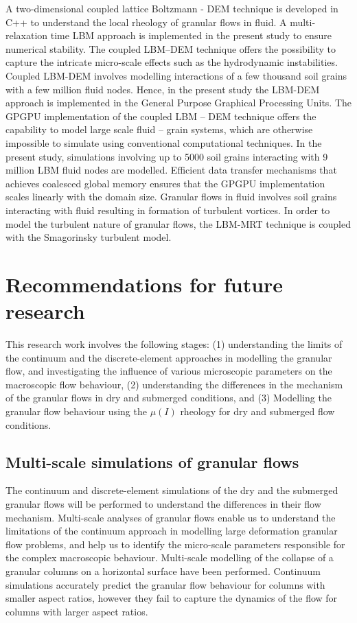 A two-dimensional coupled lattice Boltzmann - DEM technique is developed in C++ 
to understand the local rheology of granular flows in fluid. A multi-relaxation 
time LBM approach is implemented in the present study to ensure numerical 
stability. The coupled LBM--DEM technique offers the possibility to capture the 
intricate micro-scale effects such as the hydrodynamic instabilities. Coupled 
LBM-DEM involves modelling interactions of a few thousand soil grains with a 
few million fluid nodes. Hence, in the present study the LBM-DEM approach is 
implemented in the General Purpose Graphical Processing Units. The GPGPU 
implementation of the coupled LBM -- DEM technique offers the capability to 
model large scale fluid -- grain systems, which are otherwise impossible to 
simulate using conventional computational techniques. In the present study, 
simulations involving up to 5000 soil grains interacting with 9 million LBM 
fluid nodes are modelled. Efficient data transfer mechanisms that achieves 
coalesced global memory ensures that the GPGPU implementation scales linearly 
with the domain size. Granular flows in fluid involves soil grains interacting 
with fluid resulting in formation of turbulent vortices. In order to model the 
turbulent nature of granular flows, the LBM-MRT technique is coupled with the 
Smagorinsky turbulent model. 

\section{Recommendations for future research}
This research work involves the following stages: (1) understanding the limits 
of the continuum and the discrete-element approaches in modelling the granular 
flow, and investigating the influence of various microscopic parameters on the 
macroscopic flow behaviour, (2) understanding the 
differences in the mechanism of the granular flows in dry and submerged 
conditions, and (3) Modelling the granular flow behaviour using the $\mu(I)$ 
rheology for dry and submerged flow conditions.

\subsection{Multi-scale simulations of granular flows}
The continuum and discrete-element simulations of the dry and the submerged 
granular flows will be performed to understand the differences in their flow 
mechanism. Multi-scale analyses of granular flows enable us to understand the 
limitations of the continuum approach in modelling large deformation granular 
flow problems, and help us to identify the micro-scale parameters responsible 
for the complex macroscopic behaviour. Multi-scale modelling of the collapse of 
a granular columns on a horizontal surface have been performed. Continuum 
simulations accurately predict the granular flow behaviour for columns with 
smaller aspect ratios, however they fail to capture the dynamics of the flow 
for columns with larger aspect ratios. 

